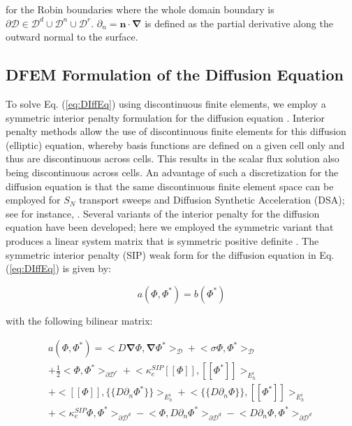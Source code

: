 \documentclass{anstrans}
\renewcommand{\vec}[1]{\bm{#1}} %
\begin{document}
\noindent for the Robin boundaries where the whole domain boundary is $\partial \mathcal{D} \in \mathcal{D}^d \cup \mathcal{D}^n \cup \mathcal{D}^r$. $\partial_n = \vec{n} \cdot \vec{\nabla}$ is defined as the partial derivative along the outward normal to the surface.

\subsection{DFEM Formulation of the Diffusion Equation}
\label{sec::DFEM}

To solve Eq. (\ref{eq:DIffEq}) using discontinuous finite elements, we employ a symmetric interior penalty formulation for the diffusion equation \cite{ref::nitsche_IP,ref::arnold_1982_IP,riviere_book}. Interior penalty methods allow the use of discontinuous finite elements for this diffusion (elliptic) equation, whereby basis functions are defined on a given cell only and thus are discontinuous across cells. This results in the scalar flux solution also being discontinuous across cells. An advantage of such a discretization for the diffusion equation is that the same discontinuous finite element space can be employed for $S_N$ transport sweeps and Diffusion Synthetic Acceleration (DSA); see for instance, \cite{ref::DSA_2D_arb_poly,ref::DSA_wang_ragusa}. Several variants of the interior penalty for the diffusion equation have been developed; here we employed the symmetric variant that produces a linear system matrix that is symmetric positive definite \cite{riviere_book}. The symmetric interior penalty (SIP) weak form for the diffusion equation in Eq. (\ref{eq:DIffEq}) is given by:

\begin{equation}
a( \Phi, \Phi^*) = b(\Phi^*)
\label{eq:SIP_bilinear_form}
\end{equation}

\noindent with the following bilinear matrix:

\begin{equation}
\begin{aligned}
a( \Phi, \Phi^*) = \Big<  D \vec{\nabla}  \Phi , \vec{\nabla} \Phi^*  \Big>_{\mathcal{D}} + \Big<  \sigma   \Phi ,  \Phi^*  \Big>_{\mathcal{D}} \\
+  \frac{1}{2} \Big<    \Phi ,   \Phi^*\Big>_{\partial \mathcal{D}^r} +  \Big< \kappa_e^{SIP} [\![   \Phi ]\!] , [\![  \Phi^* ]\!]\Big>_{E_h^i}  \\ 
+ \Big<  [\![   \Phi ]\!] , \{\!\{  D \partial_n \Phi^* \}\!\}\Big>_{E_h^i} +\Big< \{\!\{  D \partial_n  \Phi \}\!\} , [\![  \Phi^* ]\!]\Big>_{E_h^i} \\
+ \Big< \kappa_e^{SIP}   \Phi ,   \Phi^* \Big>_{\partial \mathcal{D}^d} -\Big<   \Phi  ,  D \partial_n \Phi^* \Big>_{\partial \mathcal{D}^d} -\Big<   D \partial_n  \Phi ,   \Phi^*\Big>_{\partial \mathcal{D}^d}  
\end{aligned}
\label{eq::SIP_bilinear_op}
\end{equation}
\end{document}
